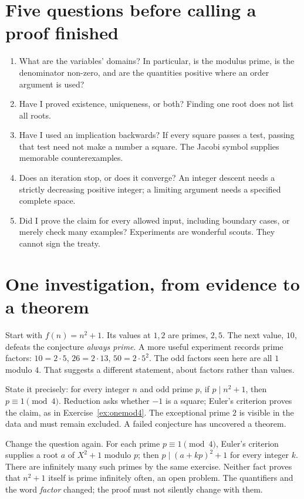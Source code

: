 \section*{Five questions before calling a proof finished}
\begin{enumerate}
\item What are the variables' domains? In particular, is the modulus prime, is the denominator non-zero,
and are the quantities positive where an order argument is used?
\item Have I proved existence, uniqueness, or both? Finding one root does not list all roots.
\item Have I used an implication backwards? If every square passes a test, passing that test need not make a
number a square. The Jacobi symbol supplies memorable counterexamples.
\item Does an iteration stop, or does it converge? An integer descent needs a strictly decreasing positive
integer; a limiting argument needs a specified complete space.
\item Did I prove the claim for every allowed input, including boundary cases, or merely check many examples?
Experiments are wonderful scouts. They cannot sign the treaty.
\end{enumerate}

\section*{One investigation, from evidence to a theorem}
Start with $f(n)=n^2+1$. Its values at $1,2$ are primes, $2,5$.
The next value, $10$, defeats the conjecture \emph{always prime}.
A more useful experiment records prime factors:
$10=2\cdot5$, $26=2\cdot13$, $50=2\cdot5^2$.
The odd factors seen here are all $1$ modulo $4$.
That suggests a different statement, about factors rather than values.

State it precisely: for every integer $n$ and odd prime $p$,
if $p\mid n^2+1$, then $p\equiv1\pmod4$.
Reduction asks whether $-1$ is a square; Euler's criterion proves the claim,
as in Exercise~\ref{ex:onemod4}. The exceptional prime $2$ is visible in the
data and must remain excluded. A failed conjecture has uncovered a theorem.

Change the question again. For each prime $p\equiv1\pmod4$,
Euler's criterion supplies a root $a$ of $X^2+1$ modulo $p$;
then $p\mid(a+kp)^2+1$ for every integer $k$.
There are infinitely many such primes by the same exercise.
Neither fact proves that $n^2+1$ itself is prime infinitely often,
an open problem. The quantifiers and the word \emph{factor} changed;
the proof must not silently change with them.

